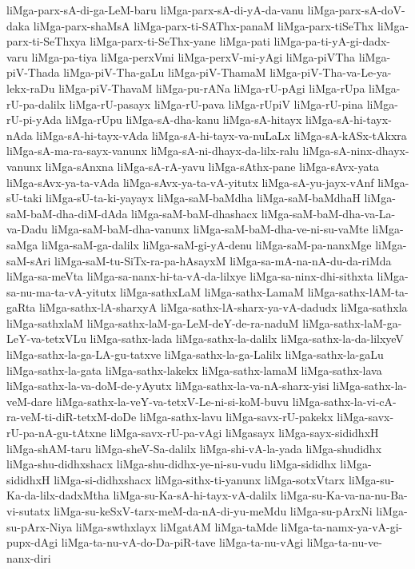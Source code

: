 {liMga-parx-sA-di-ga-LeM-baru
liMga-parx-sA-di-yA-da-vanu
liMga-parx-sA-doV-daka
liMga-parx-shaMsA
liMga-parx-ti-SAThx-panaM
liMga-parx-tiSeThx
liMga-parx-ti-SeThxya
liMga-parx-ti-SeThx-yane
liMga-pati
liMga-pa-ti-yA-gi-dadx-varu
liMga-pa-tiya
liMga-perxVmi
liMga-perxV-mi-yAgi
liMga-piVTha
liMga-piV-Thada
liMga-piV-Tha-gaLu
liMga-piV-ThamaM
liMga-piV-Tha-va-Le-ya-lekx-raDu
liMga-piV-ThavaM
liMga-pu-rANa
liMga-rU-pAgi
liMga-rUpa
liMga-rU-pa-dalilx
liMga-rU-pasayx
liMga-rU-pava
liMga-rUpiV
liMga-rU-pina
liMga-rU-pi-yAda
liMga-rUpu
liMga-sA-dha-kanu
liMga-sA-hitayx
liMga-sA-hi-tayx-nAda
liMga-sA-hi-tayx-vAda
liMga-sA-hi-tayx-va-nuLaLx
liMga-sA-kASx-tAkxra
liMga-sA-ma-ra-sayx-vanunx
liMga-sA-ni-dhayx-da-lilx-ralu
liMga-sA-ninx-dhayx-vanunx
liMga-sAnxna
liMga-sA-rA-yavu
liMga-sAthx-pane
liMga-sAvx-yata
liMga-sAvx-ya-ta-vAda
liMga-sAvx-ya-ta-vA-yitutx
liMga-sA-yu-jayx-vAnf
liMga-sU-taki
liMga-sU-ta-ki-yayayx
liMga-saM-baMdha
liMga-saM-baMdhaH
liMga-saM-baM-dha-diM-dAda
liMga-saM-baM-dhashacx
liMga-saM-baM-dha-va-La-va-Dadu
liMga-saM-baM-dha-vanunx
liMga-saM-baM-dha-ve-ni-su-vaMte
liMga-saMga
liMga-saM-ga-dalilx
liMga-saM-gi-yA-denu
liMga-saM-pa-nanxMge
liMga-saM-sAri
liMga-saM-tu-SiTx-ra-pa-hAsayxM
liMga-sa-mA-na-nA-du-da-riMda
liMga-sa-meVta
liMga-sa-nanx-hi-ta-vA-da-lilxye
liMga-sa-ninx-dhi-sithxta
liMga-sa-nu-ma-ta-vA-yitutx
liMga-sathxLaM
liMga-sathx-LamaM
liMga-sathx-lAM-ta-gaRta
liMga-sathx-lA-sharxyA
liMga-sathx-lA-sharx-ya-vA-dadudx
liMga-sathxla
liMga-sathxlaM
liMga-sathx-laM-ga-LeM-deY-de-ra-naduM
liMga-sathx-laM-ga-LeY-va-tetxVLu
liMga-sathx-lada
liMga-sathx-la-dalilx
liMga-sathx-la-da-lilxyeV
liMga-sathx-la-ga-LA-gu-tatxve
liMga-sathx-la-ga-Lalilx
liMga-sathx-la-gaLu
liMga-sathx-la-gata
liMga-sathx-lakekx
liMga-sathx-lamaM
liMga-sathx-lava
liMga-sathx-la-va-doM-de-yAyutx
liMga-sathx-la-va-nA-sharx-yisi
liMga-sathx-la-veM-dare
liMga-sathx-la-veY-va-tetxV-Le-ni-si-koM-buvu
liMga-sathx-la-vi-cA-ra-veM-ti-diR-tetxM-doDe
liMga-sathx-lavu
liMga-savx-rU-pakekx
liMga-savx-rU-pa-nA-gu-tAtxne
liMga-savx-rU-pa-vAgi
liMgasayx
liMga-sayx-sididhxH
liMga-shAM-taru
liMga-sheV-Sa-dalilx
liMga-shi-vA-la-yada
liMga-shudidhx
liMga-shu-didhxshacx
liMga-shu-didhx-ye-ni-su-vudu
liMga-sididhx
liMga-sididhxH
liMga-si-didhxshacx
liMga-sithx-ti-yanunx
liMga-sotxVtarx
liMga-su-Ka-da-lilx-dadxMtha
liMga-su-Ka-sA-hi-tayx-vA-dalilx
liMga-su-Ka-va-na-nu-Ba-vi-sutatx
liMga-su-keSxV-tarx-meM-da-nA-di-yu-meMdu
liMga-su-pArxNi
liMga-su-pArx-Niya
liMga-swthxlayx
liMgatAM
liMga-taMde
liMga-ta-namx-ya-vA-gi-pupx-dAgi
liMga-ta-nu-vA-do-Da-piR-tave
liMga-ta-nu-vAgi
liMga-ta-nu-ve-nanx-diri
}
